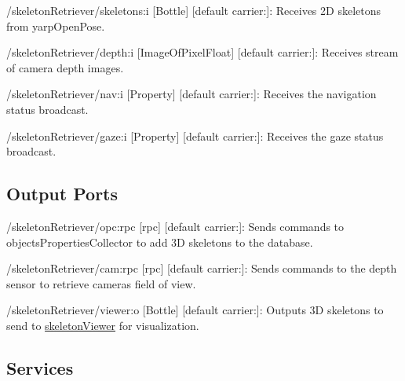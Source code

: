 \begin{DoxyItemize}
\item /skeleton\+Retriever/skeletons\+:i \mbox{[}Bottle\mbox{]} \mbox{[}default carrier\+:\mbox{]}\+: Receives 2D skeletons from yarp\+Open\+Pose.
\item /skeleton\+Retriever/depth\+:i \mbox{[}Image\+Of\+Pixel\+Float\mbox{]} \mbox{[}default carrier\+:\mbox{]}\+: Receives stream of camera depth images.
\item /skeleton\+Retriever/nav\+:i \mbox{[}Property\mbox{]} \mbox{[}default carrier\+:\mbox{]}\+: Receives the navigation status broadcast.
\item /skeleton\+Retriever/gaze\+:i \mbox{[}Property\mbox{]} \mbox{[}default carrier\+:\mbox{]}\+: Receives the gaze status broadcast.
\end{DoxyItemize}\hypertarget{group__skeletonViewer_outputports_sec}{}\subsection{Output Ports}\label{group__skeletonViewer_outputports_sec}

\begin{DoxyItemize}
\item /skeleton\+Retriever/opc\+:rpc \mbox{[}rpc\mbox{]} \mbox{[}default carrier\+:\mbox{]}\+: Sends commands to objects\+Properties\+Collector to add 3D skeletons to the database.
\item /skeleton\+Retriever/cam\+:rpc \mbox{[}rpc\mbox{]} \mbox{[}default carrier\+:\mbox{]}\+: Sends commands to the depth sensor to retrieve camera\textquotesingle{}s field of view.
\item /skeleton\+Retriever/viewer\+:o \mbox{[}Bottle\mbox{]} \mbox{[}default carrier\+:\mbox{]}\+: Outputs 3D skeletons to send to \mbox{\hyperlink{group__skeletonViewer}{skeleton\+Viewer}} for visualization.
\end{DoxyItemize}\hypertarget{group__skeletonViewer_services_sec}{}\subsection{Services}\label{group__skeletonViewer_services_sec}
